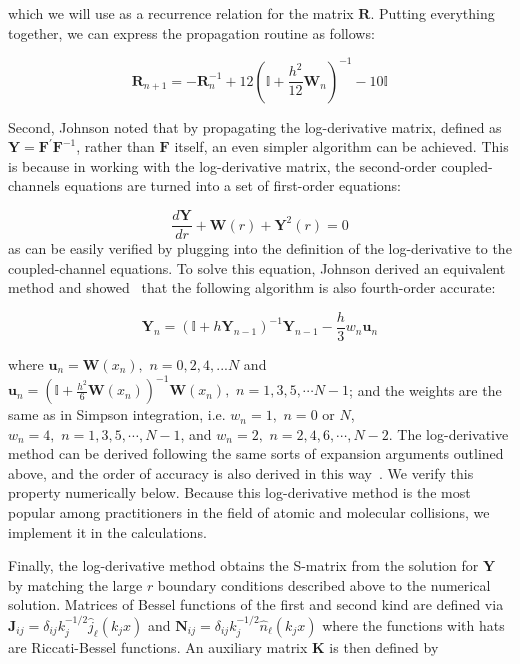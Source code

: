 \documentclass[%
 reprint,
 amsmath,amssymb,
 aps,
 nofootinbib
]{revtex4-1}
\begin{document}
\noindent which we will use as a recurrence relation for the matrix $\mathbf{R}$. Putting everything together, we can express the propagation routine as follows:

\begin{equation}
\mathbf{R}_{n+1} = -\mathbf{R}_n^{-1} + 12 \left(\mathbb{I} + \frac{h^2}{12} \mathbf{W}_n \right)^{-1} - 10\mathbb{I}
\end{equation}

\noindent Second, Johnson noted that by propagating the log-derivative matrix, defined as $\mathbf{Y} = \mathbf{F}^\prime \mathbf{F}^{-1}$, rather than $\mathbf{F}$ itself, an even simpler algorithm can be achieved. This is because in working with the log-derivative matrix, the second-order coupled-channels equations are turned into a set of first-order equations:

\begin{equation}
\frac{d \mathbf{Y}}{dr} + \mathbf{W}(r) + \mathbf{Y}^2(r) = 0
\label{eq:LogDerivEq}
\end{equation} 
\noindent as can be easily verified by plugging into the definition of the log-derivative to the coupled-channel equations. To solve this equation, Johnson derived an equivalent method and showed~\cite{Johnson73,JohnsonNumerov} that the following algorithm is also fourth-order accurate:

\begin{equation}
\mathbf{Y}_n = \left(\mathbb{I} + h \mathbf{Y}_{n-1}\right)^{-1} \mathbf{Y}_{n-1} - \frac{h}{3} w_n \mathbf{u}_n
\end{equation}

\noindent where $\mathbf{u}_n = \mathbf{W}(x_n), \,\, n = 0, 2,4,...N$ and $\mathbf{u}_n = \left( \mathbb{I} + \frac{h^2}{6} \mathbf{W}(x_n)\right)^{-1} \mathbf{W}(x_n),\,\,  n = 1, 3, 5, \cdots N-1$; and the weights are the same as in Simpson integration, i.e. $w_n = 1,\,\,  n = 0\text{ or } N$, $w_n = 4, \,\, n = 1, 3, 5, \cdots, N-1$, and $w_n = 2, \,\, n = 2, 4, 6, \cdots, N-2$. The log-derivative method can be derived following the same sorts of expansion arguments outlined above, and the order of accuracy is also derived in this way~\cite{ManJohnsonRederived,Johnson73,JohnsonNumerov,Friedman95}. We verify this property numerically below. Because this log-derivative method is the most popular among practitioners in the field of atomic and molecular collisions, we implement it in the calculations.

Finally, the log-derivative method obtains the S-matrix from the solution for $\mathbf{Y}$ by matching the large $r$ boundary conditions described above to the numerical solution. Matrices of Bessel functions of the first and second kind are defined via $\mathbf{J}_{ij} = \delta_{ij} k_j^{-1/2} \hat{j}_\ell(k_j x)$ and $\mathbf{N}_{ij} = \delta_{ij} k_j^{-1/2} \hat{n}_\ell(k_j x)$ where the functions with hats are Riccati-Bessel functions. An auxiliary matrix $\mathbf{K}$ is then defined by 
\end{document}
